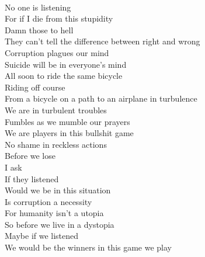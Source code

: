 \documentclass[12pt, b5paper]{article}
\begin{document}
\\No one is listening
\\For if I die from this stupidity
\\Damn those to hell
\\They can't tell the difference between right and wrong
\\Corruption plagues our mind
\\Suicide will be in everyone's mind
\\All soon to ride the same bicycle
\\Riding off course
\\From a bicycle on a path to an airplane in turbulence
\\We are in turbulent troubles
\\Fumbles as we mumble our prayers
\\We are players in this bullshit game
\\No shame in reckless actions
\\Before we lose
\\I ask
\\If they listened
\\Would we be in this situation
\\Is corruption a necessity
\\For humanity isn't a utopia
\\So before we live in a dystopia
\\Maybe if we listened
\\We would be the winners in this game we play

\newpage 
\end{document}
